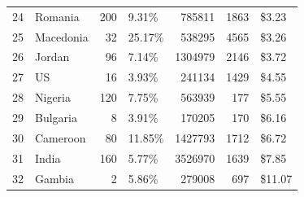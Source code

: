 \begin{table}[t]
\begin{tabular}{llrlrrl}
24 & Romania & 200 & 9.31\% & 785811 & 1863 & \$3.23 \\
25 & Macedonia & 32 & 25.17\% & 538295 & 4565 & \$3.26 \\
26 & Jordan & 96 & 7.14\% & 1304979 & 2146 & \$3.72 \\
27 & US & 16 & 3.93\% & 241134 & 1429 & \$4.55 \\
28 & Nigeria & 120 & 7.75\% & 563939 & 177 & \$5.55 \\
29 & Bulgaria & 8 & 3.91\% & 170205 & 170 & \$6.16 \\
30 & Cameroon & 80 & 11.85\% & 1427793 & 1712 & \$6.72 \\
31 & India & 160 & 5.77\% & 3526970 & 1639 & \$7.85 \\
32 & Gambia & 2 & 5.86\% & 279008 & 697 & \$11.07 \\
\bottomrule
\end{tabular}
\end{table}



